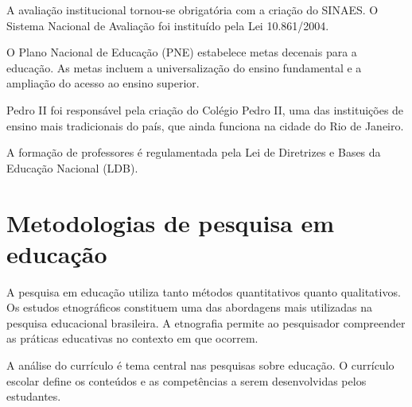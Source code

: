 \documentclass[a4paper, 12pt]{report}
\begin{document}
A avaliação institucional tornou-se obrigatória com a criação do
SINAES. O
Sistema Nacional de Avaliação foi instituído
pela Lei 10.861/2004.



O Plano Nacional de Educação (PNE) estabelece metas
decenais para a educação. As metas incluem a universalização
do ensino fundamental e a ampliação do acesso ao ensino superior.

Pedro II foi responsável pela criação do Colégio
Pedro II, uma das instituições de ensino mais tradicionais
do país, que ainda funciona na cidade do Rio de Janeiro.

A formação de professores é regulamentada pela
Lei de Diretrizes e Bases da Educação Nacional
(LDB).

\chapter{Metodologias de pesquisa em educação}

A pesquisa em educação utiliza tanto métodos
quantitativos quanto
qualitativos. Os estudos
etnográficos constituem uma das abordagens mais
utilizadas na pesquisa educacional brasileira. A etnografia permite ao
pesquisador compreender as práticas educativas no contexto em que ocorrem.

A análise do currículo é tema central nas pesquisas sobre
educação. O currículo escolar define os conteúdos e as competências a serem
desenvolvidas pelos estudantes.
\end{document}
